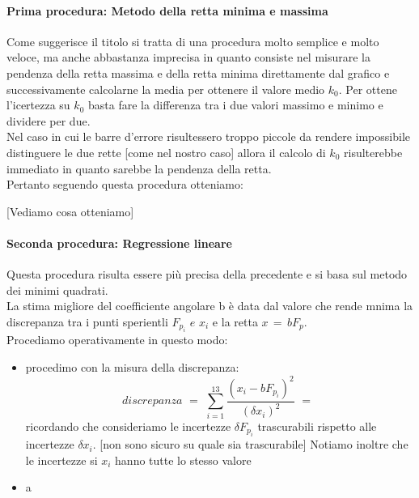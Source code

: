 \paragraph{Prima procedura: Metodo della retta minima e massima\\}
Come suggerisce il titolo si tratta di una procedura molto semplice e molto veloce, ma anche abbastanza imprecisa in quanto consiste nel misurare la pendenza della retta massima e della retta minima direttamente dal grafico e successivamente calcolarne la media per ottenere il valore medio $k_0$. Per ottene l'icertezza su $k_0$ basta fare la differenza tra i due valori massimo e minimo e dividere per due.\\
Nel caso in cui le barre d'errore risultessero troppo piccole da rendere impossibile distinguere le due rette [come nel nostro caso] allora il calcolo di $k_0$ risulterebbe immediato in quanto sarebbe la pendenza della retta.\\
Pertanto seguendo questa procedura otteniamo:

[Vediamo cosa otteniamo]

\paragraph{Seconda procedura: Regressione lineare\\}
Questa procedura risulta essere più precisa della precedente e si basa sul metodo dei minimi quadrati.\\
La stima migliore del coefficiente angolare b è data dal valore che rende mnima la discrepanza tra i punti sperientli $F_{p_i} \,\,e\,\, x_i$ e la retta $x \,=\, bF_p$.\\
Procediamo operativamente in questo modo:
\begin{itemize}
	\item{procedimo con la misura della discrepanza:
			\begin{equation*}
				discrepanza \,\,=\,\, \sum_{i=1}^{13} \frac{(x_i - bF_{p_i})^2}{(\delta x_i)^2} \,\,=\,\,		
			\end{equation*}
			ricordando che consideriamo le incertezze $\delta F_{p_i}$ trascurabili rispetto alle incertezze $\delta x_i$. [non sono sicuro su quale sia trascurabile] Notiamo inoltre che le incertezze si $x_i$ hanno tutte lo stesso valore}
	\item{a}
\end{itemize}





